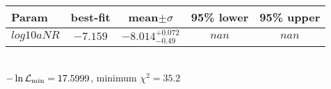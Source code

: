 \begin{tabular}{|l|c|c|c|c|} 
 \hline 
Param & best-fit & mean$\pm\sigma$ & 95\% lower & 95\% upper \\ \hline 
$log10aNR$ &$-7.159$ & $-8.014_{-0.49}^{+0.072}$ & $nan$ & $nan$ \\ 
\hline 
 \end{tabular} \\ 
$-\ln{\cal L}_\mathrm{min} =17.5999$, minimum $\chi^2=35.2$ \\ 
